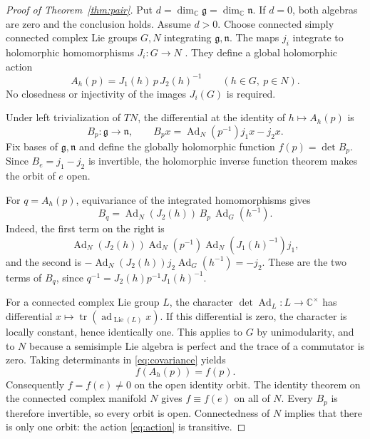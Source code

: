 \documentclass[11pt]{amsart}
\theoremstyle{remark}
\newcommand{\g}{\mathfrak g}
\newcommand{\n}{\mathfrak n}
\newcommand{\C}{\mathbb C}
\DeclareMathOperator{\Ad}{Ad}
\DeclareMathOperator{\ad}{ad}
\DeclareMathOperator{\tr}{tr}
\begin{document}
\begin{proof}[Proof of Theorem~\ref{thm:pair}]
Put \(d=\dim_{\C}\g=\dim_{\C}\n\).
If \(d=0\), both algebras are zero and the conclusion holds.
Assume \(d>0\).
Choose connected simply connected complex Lie groups \(G,N\)
integrating \(\g,\n\).  The maps \(j_i\) integrate to holomorphic
homomorphisms \(J_i:G\to N\)
\cite[Theorems~9.12--9.13 and Corollary~9.14]{Etingof}.
They define a global holomorphic action
\begin{equation}\label{eq:action}
 A_h(p)=J_1(h)\,p\,J_2(h)^{-1}\qquad(h\in G,\ p\in N).
\end{equation}
No closedness or injectivity of the images \(J_i(G)\) is required.

Under left trivialization of \(TN\), the differential at the identity
of \(h\mapsto A_h(p)\) is
\begin{equation}\label{eq:B}
 B_p:\g\longrightarrow\n,\qquad
 B_px=\Ad_N(p^{-1})j_1x-j_2x .
\end{equation}
Fix bases of \(\g,\n\) and define the globally holomorphic function
\(f(p)=\det B_p\).  Since \(B_e=j_1-j_2\) is invertible, the
holomorphic inverse function theorem makes the orbit of \(e\) open.

For \(q=A_h(p)\), equivariance of the integrated homomorphisms gives
\begin{equation}\label{eq:covariance}
 B_q=\Ad_N(J_2(h))\,B_p\,\Ad_G(h^{-1}).
\end{equation}
Indeed, the first term on the right is
\[
 \Ad_N(J_2(h))\Ad_N(p^{-1})\Ad_N(J_1(h)^{-1})j_1,
\]
and the second is
\(-\Ad_N(J_2(h))j_2\Ad_G(h^{-1})=-j_2\).
These are the two terms of \(B_q\), since
\(q^{-1}=J_2(h)p^{-1}J_1(h)^{-1}\).

For a connected complex Lie group \(L\), the character
\(\det\Ad_L:L\to\C^\times\) has differential
\(x\mapsto\tr(\ad_{\operatorname{Lie}(L)}x)\).
If this differential is zero, the character is locally constant,
hence identically one.  This applies to \(G\) by unimodularity,
and to \(N\) because a semisimple Lie algebra is perfect and the trace
of a commutator is zero.  Taking determinants in
\eqref{eq:covariance} yields
\[
 f(A_h(p))=f(p).
\]
Consequently \(f=f(e)\ne0\) on the open identity orbit.
The identity theorem on the connected complex manifold \(N\) gives
\(f\equiv f(e)\) on all of \(N\).
Every \(B_p\) is therefore invertible, so every orbit is open.
Connectedness of \(N\) implies that there is only one orbit:
the action \eqref{eq:action} is transitive.


\end{proof}
\end{document}
